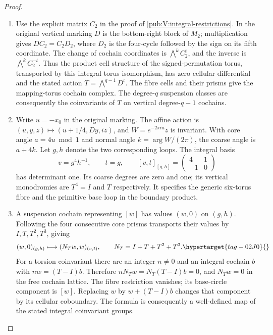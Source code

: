 \documentclass[11pt,a4paper]{article}
\numberwithin{equation}{section}
\theoremstyle{definition}
\begin{document}
\begin{proof}
\begin{enumerate}[label=\arabic*.]
\item Use the explicit matrix $C_2$ in the proof of
\cref{pub:V:integral-restrictions}.  In the original vertical marking $D$ is the
bottom-right block of $M_2$; multiplication gives
$DC_2=C_2D_2$, where $D_2$ is the four-cycle followed by the sign
on its fifth coordinate.  The change of cochain coordinates is
$\bigwedge^kC_2^t$, and the inverse is $\bigwedge^kC_2^{-t}$.
Thus the product cell structure of the signed-permutation torus,
transported by this integral torus isomorphism, has zero cellular
differential and the stated action $T=\bigwedge^{q-1}D^t$.
The fibre cells and their prisms give the mapping-torus
cochain complex.  The degree-$q$ suspension classes are consequently
the coinvariants of $T$ on vertical degree-$q-1$ cochains.

\item Write $u=-x_0$ in the original marking.  The affine action is
$(u,y,z)\mapsto(u+1/4,Dy,iz)$, and
$W=e^{-2\pi i u}z$ is invariant.  With core angle $a=4u\bmod1$
and normal angle $k=\arg W/(2\pi)$, the coarse angle is $a+4k$.
Let $g,h$ denote the two corresponding loops.  The integral basis
\[
 v=g^4h^{-1},\qquad t=g,
 \qquad [v,t]_{[g,h]}=\begin{pmatrix}4&1\\-1&0\end{pmatrix}
\]
has determinant one.  Its coarse degrees are zero and one; its
vertical monodromies are $T^4=I$ and $T$ respectively.
It specifies the generic six-torus fibre and the primitive
base loop in the boundary product.

\item A suspension cochain representing $[w]$ has values $(w,0)$
on $(g,h)$.  Following the four consecutive core prisms transports
their values by $I,T,T^2,T^3$, giving
\begin{equation}
 (w,0)_{(g,h)}\longmapsto(N_Tw,w)_{(v,t)},
 \qquad N_T=I+T+T^2+T^3.
 \hypertarget{tag-02J0}{}\label{maps:eq:FT.1}
\end{equation}
For a torsion coinvariant there are an integer $n\ne0$ and an
integral cochain $b$ with $nw=(T-I)b$.  Therefore
$nN_Tw=N_T(T-I)b=0$, and $N_Tw=0$ in the free cochain lattice.
The fibre restriction vanishes; its base-circle component is $[w]$.
Replacing $w$ by $w+(T-I)b$ changes that component by its cellular
coboundary.  The formula is consequently a well-defined map of the
stated integral coinvariant groups.


\end{enumerate}
\end{proof}
\end{document}
